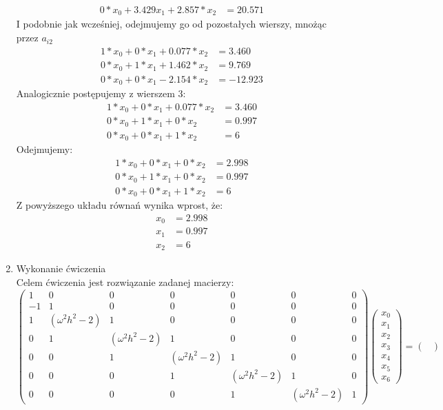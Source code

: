 \documentclass[12pt,a4paper]{article}
\begin{document}
\begin{enumerate}
\begin{align}
\nonumber 0*x_0+3.429x_1+2.857*x_2&=20.571
\end{align}
I podobnie jak wcześniej, odejmujemy go od pozostałych wierszy, mnożąc przez $a_{i2}$
\begin{align}
1*x_0+0*x_1+0.077*x_2&=3.460\\
\nonumber 0*x_0+1*x_1+1.462*x_2&=9.769\\
\nonumber 0*x_0+0*x_1-2.154*x_2&=-12.923
\end{align}
Analogicznie postępujemy z wierszem 3:
\begin{align}
1*x_0+0*x_1+0.077*x_2&=3.460\\
\nonumber 0*x_0+1*x_1+0*x_2&=0.997\\
\nonumber 0*x_0+0*x_1+1*x_2&=6
\end{align}
Odejmujemy:
\begin{align}
1*x_0+0*x_1+0*x_2&=2.998\\
\nonumber 0*x_0+1*x_1+0*x_2&=0.997\\
\nonumber 0*x_0+0*x_1+1*x_2&=6
\end{align}
Z powyższego układu równań wynika wprost, że:
\begin{align}
x_0&=2.998\\
\nonumber x_1&=0.997\\
\nonumber x_2&=6
\end{align}
\item Wykonanie ćwiczenia\\
Celem ćwiczenia jest rozwiązanie zadanej macierzy:\\
\footnotesize
\begin{equation}
\begin{pmatrix}
1&0&0&0&0&0&0\\
-1&1&0&0&0&0&0\\
1&(\omega^2h^2-2)&1&0&0&0&0\\
0&1&(\omega^2h^2-2)&1&0&0&0\\
0&0&1&(\omega^2h^2-2)&1&0&0\\
0&0&0&1&(\omega^2h^2-2)&1&0\\
0&0&0&0&1&(\omega^2h^2-2)&1
\end{pmatrix}
\begin{pmatrix}
x_0\\
x_1\\
x_2\\
x_3\\
x_4\\
x_5\\
x_6
\end{pmatrix}
=
\begin{pmatrix}

\end{pmatrix}
\end{equation}
\end{enumerate}
\end{document}
